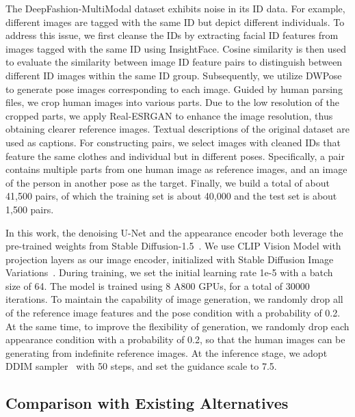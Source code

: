 The DeepFashion-MultiModal dataset exhibits noise in its ID data. For example, different images are tagged with the same ID but depict different individuals. To address this issue, we first cleanse the IDs by extracting facial ID features from images tagged with the same ID using InsightFace\cite{deng2018arcface, InsightFaceProject}. Cosine similarity is then used to evaluate the similarity between image ID feature pairs to distinguish between different ID images within the same ID group. Subsequently, we utilize DWPose\cite{yang2023dwpose} to generate pose images corresponding to each image. Guided by human parsing files, we crop human images into various parts. Due to the low resolution of the cropped parts, we apply Real-ESRGAN\cite{wang2021realesrgan} to enhance the image resolution, thus obtaining clearer reference images. Textual descriptions of the original dataset are used as captions. For constructing pairs, we select images with cleaned IDs that feature the same clothes and individual but in different poses. Specifically, a pair contains multiple parts from one human image as reference images, and an image of the person in another pose as the target. Finally, we build a total of about 41,500 pairs, of which the training set is about 40,000 and the test set is about 1,500 pairs.

In this work, the denoising U-Net and the appearance encoder both leverage the pre-trained weights from Stable Diffusion-1.5~\cite{rombach2022ldm}. We use CLIP Vision Model with projection layers as our image encoder, initialized with Stable Diffusion Image Variations~\cite{sdimagevariation}. During training, we set the initial learning rate 1e-5 with a batch size of 64. The model is trained using 8 A800 GPUs, for a total of 30000 iterations. To maintain the capability of image generation, we randomly drop all of the reference image features and the pose condition with a probability of 0.2. At the same time, to improve the flexibility of generation, we randomly drop each appearance condition with a probability of 0.2, so that the human images can be generating from indefinite reference images. At the inference stage, we adopt DDIM sampler~\cite{song2020ddim} with 50 steps, and set the guidance scale to 7.5.

\subsection{Comparison with Existing Alternatives}

